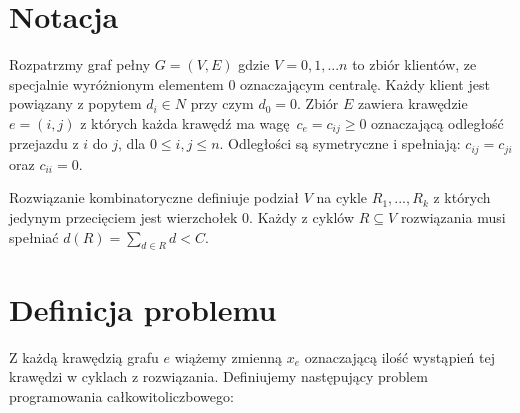 \documentclass[fleqn,11pt]{article}
\begin{document}
\section{Notacja}

Rozpatrzmy graf pełny $G = (V, E)$ gdzie $V = {0, 1, ... n}$ to zbiór klientów, ze specjalnie wyróżnionym elementem ${ 0 }$ oznaczającym centralę.  Każdy klient jest powiązany z popytem $d_i \in N$ przy czym $d_0 = 0$.  Zbiór $E$ zawiera krawędzie $e = (i,j)$ z których każda krawędź ma wagę $c_e = c_{ij} \geq 0$ oznaczającą odległość przejazdu z $i$ do $j$, dla $0 \leq i, j \leq n$.  Odległości są symetryczne i spełniają: $c_{ij} = c_{ji}$ oraz $c_{ii} = 0$.

Rozwiązanie kombinatoryczne definiuje podział $V$ na cykle ${R_1, ..., R_k}$ z których jedynym przecięciem jest wierzchołek $0$.  Każdy z cyklów $R \subseteq V$ rozwiązania musi spełniać $d(R) = \sum_{d \in R}^{} { d } < C$.

\section{Definicja problemu}
    Z każdą krawędzią grafu $e$ wiążemy zmienną $x_e$ oznaczającą ilość wystąpień tej krawędzi w cyklach z rozwiązania.  Definiujemy następujący problem programowania całkowitoliczbowego:
\end{document}
